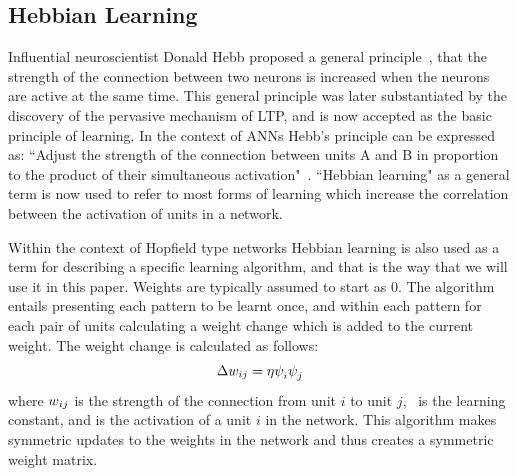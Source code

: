 \subsection{Hebbian Learning}   %
\label{sec:HebbianLearning}

Influential neuroscientist Donald Hebb proposed a general principle~\citep{Hebb1949}, that the strength of the connection between two neurons is increased when the neurons are active at the same time.  This general principle was later substantiated by the discovery of the pervasive mechanism of LTP, and is now accepted as the basic principle of learning.  In the context of ANNs Hebb's principle can be expressed as: ``Adjust the strength of the connection between units A and B in proportion to the product of their simultaneous activation"~\citep{vol1p36}.  ``Hebbian learning" as a general term is now used to refer to most forms of learning which increase the correlation between the activation of units in a network.  

Within the context of Hopfield type networks Hebbian learning is also used as a term for describing a specific learning algorithm, and that is the way that we will use it in this paper.  Weights are typically assumed to start as $0$.  The algorithm entails presenting each pattern to be learnt once, and within each pattern for each pair of units calculating a weight change which is added to the current weight.  The weight change is calculated as follows:
\begin{equation}
	\label{eq:Hebbianlearning}
	\Delta w_{ij} = \eta\psi_{i}^{}\psi_{j}^{}
\end{equation}
where \(w_{ij}\) is the strength of the connection from unit \(i\) to unit \(j\), \learningConstant\  is the learning constant, and  is the activation of a unit $i$ in the network.  This algorithm makes symmetric updates to the weights in the network and thus creates a symmetric weight matrix.  


